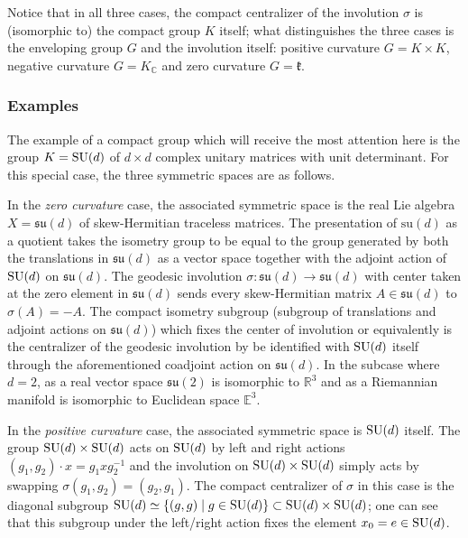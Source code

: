 \documentclass[notitlepage]{article}
\begin{document}
Notice that in all three cases, the compact centralizer of the involution $\sigma$ is (isomorphic to) the compact group $K$ itself; what distinguishes the three cases is the enveloping group $G$ and the involution itself: positive curvature $G = K \times K$, negative curvature $G = K_{\mathbb C}$ and zero curvature $G = \mathfrak k$.

\subsubsection{Examples}

The example of a compact group which will receive the most attention here is the group $K = \operatorname{SU}(d)$ of $d\times d$ complex unitary matrices with unit determinant.
For this special case, the three symmetric spaces are as follows.

In the \textit{zero curvature} case, the associated symmetric space is the real Lie algebra $X = \mathfrak{su}(d)$ of skew-Hermitian traceless matrices.
The presentation of $\mathrm{su}(d)$ as a quotient takes the isometry group to be equal to the group generated by both the translations in $\mathfrak{su}(d)$ as a vector space together with the adjoint action of $\operatorname{SU}(d)$ on $\mathfrak{su}(d)$.
The geodesic involution $\sigma : \mathfrak{su}(d) \to \mathfrak{su}(d)$ with center taken at the zero element in $\mathfrak{su}(d)$ sends every skew-Hermitian matrix $A \in \mathfrak{su}(d)$ to $\sigma(A) = -A$.
The compact isometry subgroup (subgroup of translations and adjoint actions on $\mathfrak{su}(d)$) which fixes the center of involution or equivalently is the centralizer of the geodesic involution by be identified with $\operatorname{SU}(d)$ itself through the aforementioned coadjoint action on $\mathfrak{su}(d)$.
In the subcase where $d=2$, as a real vector space $\mathfrak{su}(2)$ is isomorphic to $\mathbb R^3$ and as a Riemannian manifold is isomorphic to Euclidean space $\mathbb E^{3}$.

In the \textit{positive curvature} case, the associated symmetric space is $\operatorname{SU}(d)$ itself.
The group $\operatorname{SU}(d) \times \operatorname{SU}(d)$ acts on $\operatorname{SU}(d)$ by left and right actions $(g_1, g_2) \cdot x = g_1xg_2^{-1}$ and the involution on $\operatorname{SU}(d) \times \operatorname{SU}(d)$ simply acts by swapping $\sigma(g_1, g_2) = (g_2, g_1)$.
The compact centralizer of $\sigma$ in this case is the diagonal subgroup $\operatorname{SU}(d) \simeq \{(g,g)\mid g \in \operatorname{SU}(d)\} \subset \operatorname{SU}(d) \times \operatorname{SU}(d)$; one can see that this subgroup under the left/right action fixes the element $x_0 = e \in \operatorname{SU}(d)$.
\end{document}
